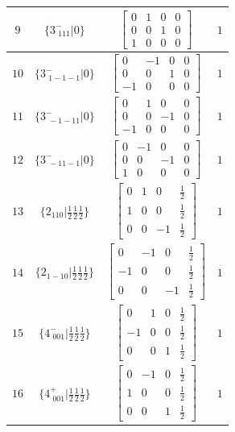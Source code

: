 \documentclass[fleqn,8pt]{jsarticle}
\begin{document}
\begin{longtable}{cccc}
$ 9 $ & $ \{3^{-}_{\,\,111}|0\} $ & $ \begin{bmatrix} 0 & 1 & 0 & 0 \\ 0 & 0 & 1 & 0 \\ 1 & 0 & 0 & 0 \end{bmatrix} $ & $ 1 $ \\ \hline
$ 10 $ & $ \{3^{-}_{\,\,1-1-1}|0\} $ & $ \begin{bmatrix} 0 & -1 & 0 & 0 \\ 0 & 0 & 1 & 0 \\ -1 & 0 & 0 & 0 \end{bmatrix} $ & $ 1 $ \\ \hline
$ 11 $ & $ \{3^{-}_{\,\,-1-11}|0\} $ & $ \begin{bmatrix} 0 & 1 & 0 & 0 \\ 0 & 0 & -1 & 0 \\ -1 & 0 & 0 & 0 \end{bmatrix} $ & $ 1 $ \\ \hline
$ 12 $ & $ \{3^{-}_{\,\,-11-1}|0\} $ & $ \begin{bmatrix} 0 & -1 & 0 & 0 \\ 0 & 0 & -1 & 0 \\ 1 & 0 & 0 & 0 \end{bmatrix} $ & $ 1 $ \\ \hline
$ 13 $ & $ \{2{}_{110}|\frac{1}{2} \frac{1}{2} \frac{1}{2}\} $ & $ \begin{bmatrix} 0 & 1 & 0 & \frac{1}{2} \\ 1 & 0 & 0 & \frac{1}{2} \\ 0 & 0 & -1 & \frac{1}{2} \end{bmatrix} $ & $ 1 $ \\ \hline
$ 14 $ & $ \{2{}_{1-10}|\frac{1}{2} \frac{1}{2} \frac{1}{2}\} $ & $ \begin{bmatrix} 0 & -1 & 0 & \frac{1}{2} \\ -1 & 0 & 0 & \frac{1}{2} \\ 0 & 0 & -1 & \frac{1}{2} \end{bmatrix} $ & $ 1 $ \\ \hline
$ 15 $ & $ \{4^{-}_{\,\,001}|\frac{1}{2} \frac{1}{2} \frac{1}{2}\} $ & $ \begin{bmatrix} 0 & 1 & 0 & \frac{1}{2} \\ -1 & 0 & 0 & \frac{1}{2} \\ 0 & 0 & 1 & \frac{1}{2} \end{bmatrix} $ & $ 1 $ \\ \hline
$ 16 $ & $ \{4^{+}_{\,\,001}|\frac{1}{2} \frac{1}{2} \frac{1}{2}\} $ & $ \begin{bmatrix} 0 & -1 & 0 & \frac{1}{2} \\ 1 & 0 & 0 & \frac{1}{2} \\ 0 & 0 & 1 & \frac{1}{2} \end{bmatrix} $ & $ 1 $ \\ \hline

\end{longtable}
\end{document}
